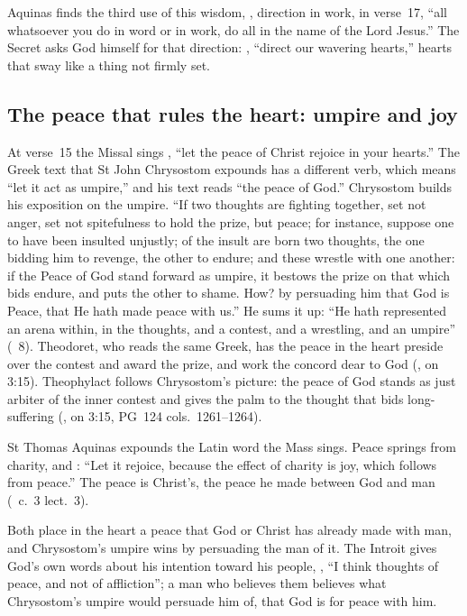 Aquinas finds the third use of this wisdom, ,
direction in work, in verse~17, ``all whatsoever you do in word or in work,
do all in the name of the Lord Jesus.'' The Secret asks God himself for that
direction: , ``direct our wavering hearts,''
hearts that sway like a thing not firmly set.

\subsection{The peace that rules the heart: umpire and joy}
\label{sec:heart-peace}

At verse~15 the Missal sings , ``let the peace of Christ rejoice in your hearts.'' The Greek text
that St John Chrysostom expounds has a different verb, which means ``let it
act as umpire,'' and his text reads ``the peace of God.'' Chrysostom builds
his exposition on the umpire. ``If two thoughts are fighting together, set
not anger, set not spitefulness to hold the prize, but peace; for instance,
suppose one to have been insulted unjustly; of the insult are born two
thoughts, the one bidding him to revenge, the other to endure; and these
wrestle with one another: if the Peace of God stand forward as umpire, it
bestows the prize on that which bids endure, and puts the other to shame.
How? by persuading him that God is Peace, that He hath made peace with us.''
He sums it up: ``He hath represented an arena within, in the thoughts, and a
contest, and a wrestling, and an umpire'' (\ 8).
Theodoret, who reads the same Greek, has the peace in the heart preside over
the contest and award the prize, and work the concord dear to God
(, on 3:15). Theophylact follows Chrysostom's
picture: the peace of God stands as just arbiter of the inner contest and
gives the palm to the thought that bids long-suffering (, on 3:15, PG~124 cols.~1261--1264).

St Thomas Aquinas expounds the Latin word the Mass sings. Peace springs from
charity, and : ``Let it rejoice, because the effect of charity is joy,
which follows from peace.'' The peace is Christ's, the peace he made between
God and man (\ c.~3 lect.~3).

Both place in the heart a peace that God or Christ has already made with
man, and Chrysostom's umpire wins by persuading the man of it. The Introit
gives God's own words about his intention toward his people, , ``I think thoughts of peace,
and not of affliction''; a man who believes them believes what Chrysostom's
umpire would persuade him of, that God is for peace with him.

